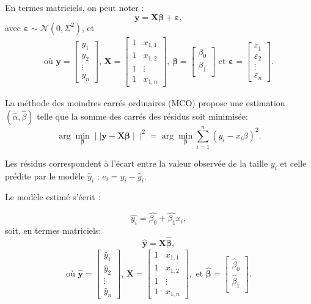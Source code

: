 \documentclass[
  11pt,
]{book}
\numberwithin{equation}{section}
\numberwithin{countremarque}{section}
\begin{document}
En termes matriciels, on peut noter :
\[\boldsymbol y = \boldsymbol X \boldsymbol \beta + \boldsymbol \varepsilon,\]
avec \(\boldsymbol \varepsilon \sim \mathcal{N}(0, \Sigma^2)\), et
\begin{align*}
\textrm{où } \boldsymbol y = \begin{bmatrix}
y_1 \\ y_2 \\ \vdots \\ y_n
\end{bmatrix}, \, \boldsymbol X = \begin{bmatrix}
1 & x_{1,1}  \\
1 & x_{1,2}  \\
1 & \vdots  \\
1 & x_{1,n} 
\end{bmatrix}, \, \boldsymbol \beta =  \begin{bmatrix}
\beta_0\\
\beta_1\\
\end{bmatrix} \textrm{ et } \boldsymbol \varepsilon = \begin{bmatrix}
\varepsilon_1\\
\varepsilon_2\\
\vdots\\
\varepsilon_n
\end{bmatrix}.
\end{align*}

La méthode des moindres carrés ordinaires (MCO) propose une estimation \((\hat\alpha, \hat\beta)\) telle que la somme des carrés des résidus soit minimisée:
\[\arg \min_{\boldsymbol \beta}\mid \mid \boldsymbol y - \boldsymbol X \boldsymbol \beta \mid \mid^2 = \arg \min_{\boldsymbol \beta} \sum_{i=1}^{n} (y_i - x_i \beta)^2.\]

Les résidus correspondent à l'écart entre la valeur observée de la taille \(y_i\) et celle prédite par le modèle \(\hat y_i\) : \(e_i = y_i - \hat y_i\).

Le modèle estimé s'écrit :

\[\hat{y_i} = \hat{\beta_0} + \hat{\beta_1} x_i,\]
soit, en termes matriciels:
\[\hat{\boldsymbol y} = \boldsymbol X \hat{\boldsymbol \beta},\]
\begin{align*}
\textrm{où } \hat{\boldsymbol y} = \begin{bmatrix}
\hat{y}_1 \\ \hat{y}_2 \\ \vdots \\ \hat{y}_n
\end{bmatrix}, \, \boldsymbol X = \begin{bmatrix}
1 & x_{1,1} \\
1 & x_{1,2} \\
1 & \vdots \\
1 & x_{1,n}
\end{bmatrix}, \textrm{ et } \hat{\boldsymbol \beta} =  \begin{bmatrix}
\hat{\beta}_0\\
\hat{\beta}_1\\
\end{bmatrix}.
\end{align*}
\end{document}
